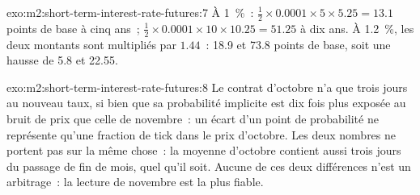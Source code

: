 \begin{solution}{exo:m2:short-term-interest-rate-futures:7}
À 1~\%~: $\frac12 \times 0.0001 \times 5 \times 5.25 = 13.1$ points de base à cinq ans~;
$\frac12 \times 0.0001 \times 10 \times 10.25 = 51.25$ à dix ans. À 1.2~\%, les deux montants sont multipliés par
$1.44$~: 18.9 et 73.8 points de base, soit une hausse de 5.8 et 22.55.
\end{solution}

\begin{solution}{exo:m2:short-term-interest-rate-futures:8}
Le contrat d'octobre n'a que trois jours au nouveau taux, si bien que sa probabilité implicite
est dix fois plus exposée au bruit de prix que celle de novembre~: un écart
d'un point de probabilité ne représente qu'une fraction de tick dans le prix
d'octobre. Les deux nombres ne portent pas sur la même chose~: la
moyenne d'octobre contient aussi trois jours du passage de fin de mois, quel qu'il soit. Aucune
de ces deux différences n'est un arbitrage~: la lecture de novembre est la plus fiable.
\end{solution}

